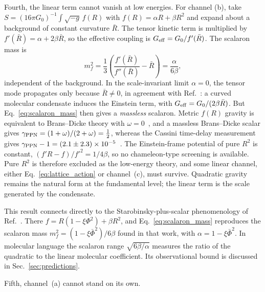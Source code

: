 \documentclass[reprint,aps,prd,amsmath,amssymb,superscriptaddress,nofootinbib,floatfix]{revtex4-2}
\theoremstyle{plain}
\theoremstyle{definition}
\theoremstyle{remark}
\begin{document}
Fourth, the linear term cannot vanish at low energies. For channel (b), take
$S=(16\pi G_0)^{-1}\int\sqrt{-g}\,f(R)$ with $f(R)=\alpha R+\beta R^2$ and expand about a background of constant curvature
$\bar R$. The tensor kinetic term is multiplied by $f'(\bar R)=\alpha+2\beta\bar R$, so the effective coupling is
$G_{\rm eff}=G_0/f'(\bar R)$. The scalaron mass is
\begin{equation}
m_f^2=\frac13\left(\frac{f'(\bar R)}{f''(\bar R)}-\bar R\right)=\frac{\alpha}{6\beta},
\label{eq:scalaron_mass}
\end{equation}
independent of the background. In the scale-invariant limit $\alpha=0$, the tensor mode propagates only
because $\bar R\neq0$, in agreement with Ref.~\cite{AlvarezGaume2016}: a curved molecular condensate induces the
Einstein term, with $G_{\rm eff}=G_0/(2\beta\bar R)$. But Eq.~\eqref{eq:scalaron_mass} then gives a \emph{massless}
scalaron. Metric $f(R)$ gravity is equivalent to Brans--Dicke theory with $\omega=0$~\cite{SotiriouFaraoni2010}, and a
massless Brans--Dicke scalar gives $\gamma_{\rm PPN}=(1+\omega)/(2+\omega)=\tfrac12$, whereas the Cassini time-delay
measurement gives $\gamma_{\rm PPN}-1=(2.1\pm2.3)\times10^{-5}$~\cite{Bertotti2003}. The Einstein-frame potential of pure
$R^2$ is constant, $(f'R-f)/f'^2=1/4\beta$, so no chameleon-type screening is available. Pure $R^2$ is therefore
excluded as the low-energy theory, and some linear channel, either Eq.~\eqref{eq:lattice_action} or
channel~(c), must survive. Quadratic gravity remains the natural form at the fundamental level; the linear
term is the scale generated by the condensate.

This result connects directly to the Starobinsky-plus-scalar phenomenology of
Ref.~\cite{FarmerLarson2026}. There $f=R(1-\xi\Phi^2)+\beta R^2$, and Eq.~\eqref{eq:scalaron_mass} reproduces the scalaron
mass $m_f^2=(1-\xi\bar\Phi^2)/6\beta$ found in that work, with $\alpha=1-\xi\bar\Phi^2$. In molecular language the scalaron
range $\sqrt{6\beta/\alpha}$ measures the ratio of the quadratic to the linear molecular coefficient. Its observational
bound is discussed in Sec.~\ref{sec:predictions}.

Fifth, channel~(a) cannot stand on its own.
\end{document}
